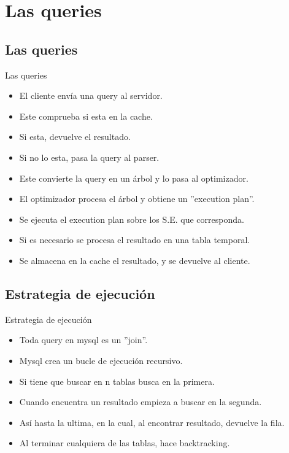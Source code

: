 \section{Las queries}

\subsection{Las queries}
\begin{frame}{Las queries}
  \begin{itemize}
    \item El cliente envía una query al servidor.
    \item Este comprueba si esta en la cache.
    \item Si esta, devuelve el resultado.
    \item Si no lo esta, pasa la query al parser.
    \item Este convierte la query en un árbol y lo pasa al optimizador.
    \item El optimizador procesa el árbol y obtiene un ''execution plan''.
    \item Se ejecuta el execution plan sobre los S.E. que corresponda.
    \item Si es necesario se procesa el resultado en una tabla temporal.
    \item Se almacena en la cache el resultado, y se devuelve al cliente.
  \end{itemize}
\end{frame}

\subsection{Estrategia de ejecución}
\begin{frame}{Estrategia de ejecución}
  \begin{itemize}
    \item Toda query en mysql es un ''join''.
    \item Mysql crea un bucle de ejecución recursivo.
    \item Si tiene que buscar en n tablas busca en la primera.
    \item Cuando encuentra un resultado empieza a buscar en la segunda.
    \item Así hasta la ultima, en la cual, al encontrar resultado, devuelve la fila.
    \item Al terminar cualquiera de las tablas, hace backtracking.
  \end{itemize}
\end{frame}

